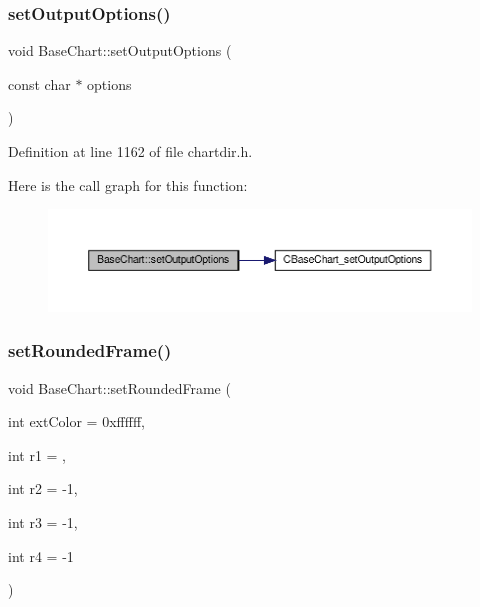 \subsubsection{\texorpdfstring{set\+Output\+Options()}{setOutputOptions()}}
{\footnotesize\ttfamily void Base\+Chart\+::set\+Output\+Options (\begin{DoxyParamCaption}\item[{const char $\ast$}]{options }\end{DoxyParamCaption})\hspace{0.3cm}{\ttfamily [inline]}}



Definition at line 1162 of file chartdir.\+h.

Here is the call graph for this function\+:
\nopagebreak
\begin{figure}[H]
\begin{center}
\leavevmode
\includegraphics[width=350pt]{class_base_chart_a486db479183dceab6fe3ff27570fc249_cgraph}
\end{center}
\end{figure}
\mbox{\label{class_base_chart_a5809eecf03754e7211a3d8712b3ff010}} 
\subsubsection{\texorpdfstring{set\+Rounded\+Frame()}{setRoundedFrame()}}
{\footnotesize\ttfamily void Base\+Chart\+::set\+Rounded\+Frame (\begin{DoxyParamCaption}\item[{int}]{ext\+Color = {\ttfamily 0xffffff},  }\item[{int}]{r1 = {},  }\item[{int}]{r2 = {\ttfamily -\/1},  }\item[{int}]{r3 = {\ttfamily -\/1},  }\item[{int}]{r4 = {\ttfamily -\/1} }\end{DoxyParamCaption})\hspace{0.3cm}{\ttfamily [inline]}}



